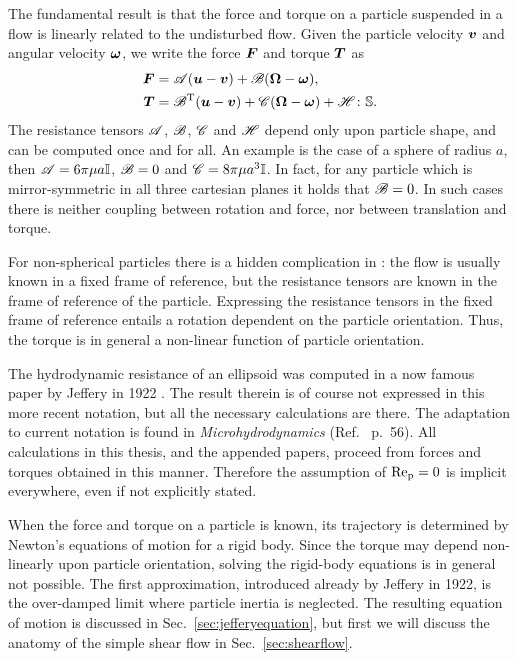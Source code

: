 \documentclass[thesis.tex]{subfiles}
\begin{document}
The fundamental result is that the force and torque on a particle suspended in a flow is linearly related to the undisturbed flow. Given the particle velocity $\mbox{\boldmath$v$}$ and angular velocity $\mbox{\boldmath$\omega$}$, we write the force $\mbox{\boldmath$F$}$ and torque $\mbox{\boldmath$T$}$ as
\begin{align}
	\ve F &= \te A (\ve u - \ve v) + \te B (\ve \Omega - \ve \omega), \nn \\
	\ve T &= \te B\transpose (\ve u - \ve v) + \te C (\ve \Omega - \ve \omega) + \te H \dd \ma S. \eqnlab{resistanceformulation}
\end{align}
The resistance tensors $\mathscr{A}$, $\mathscr{B}$, $\mathscr{C}$ and $\mathscr{H}$ depend only upon particle shape, and can be computed once and for all. An example is the case of a sphere of radius $a$, then  $\mathscr{A} = 6\pi\mu a \mathbb{I}$, $\mathscr{B} = 0$ and $\mathscr{C} = 8\pi\mu a^3 \mathbb{I}$. In fact, for any particle which is mirror-symmetric in all three cartesian planes it holds that $\mathscr{B} = 0$. In such cases there is neither coupling between rotation and force, nor between translation and torque. 

For non-spherical particles there is a hidden complication in : the flow is usually known in a fixed frame of reference, but the resistance tensors are known in the frame of reference of the particle. Expressing the resistance tensors in the fixed frame of reference entails a rotation dependent on the particle orientation. Thus, the torque is in general a non-linear function of particle orientation.

The hydrodynamic resistance of an ellipsoid was computed in a now famous paper by Jeffery in 1922 \cite{jeffery1922}. The result therein is of course not expressed in this more recent notation, but all the necessary calculations are there. The adaptation to current notation is found in \emph{Microhydrodynamics} (Ref.~ p.~56). All calculations in this thesis, and the appended papers, proceed from forces and torques obtained in this manner. Therefore the assumption of $\mbox{Re}_{\mathrm p} = 0$ is implicit everywhere, even if not explicitly stated.

When the force and torque on a particle is known, its trajectory is determined by Newton's equations of motion for a rigid body. Since the torque may depend non-linearly upon particle orientation, solving the rigid-body equations is in general not possible. The first approximation, introduced already by Jeffery in 1922, is the over-damped limit where particle inertia is neglected. The resulting equation of motion is discussed in Sec.~\ref{sec:jefferyequation}, but first we will discuss the anatomy of the simple shear flow in Sec.~\ref{sec:shearflow}.
\end{document}
